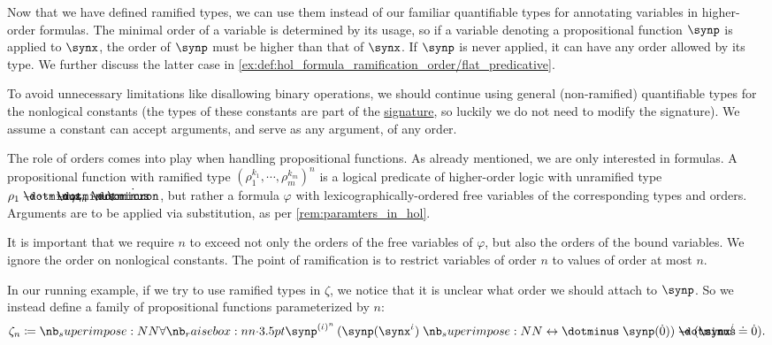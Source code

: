\begin{definition}
\begin{thmenum}
     Now that we have defined ramified types, we can use them instead of our familiar quantifiable types for annotating variables in higher-order formulas. The minimal order of a variable is determined by its usage, so if a variable denoting a propositional function \( \synp \) is applied to \( \synx \), the order of \( \synp \) must be higher than that of \( \synx \). If \( \synp \) is never applied, it can have any order allowed by its type. We further discuss the latter case in \cref{ex:def:hol_formula_ramification_order/flat_predicative}.

    To avoid unnecessary limitations like disallowing binary operations, we should continue using general (non-ramified) quantifiable types for the nonlogical constants (the types of these constants are part of the \hyperref[def:hol_signature]{signature}, so luckily we do not need to modify the signature). We assume a constant can accept arguments, and serve as any argument, of any order.

    The role of orders comes into play when handling propositional functions. As already mentioned, we are only interested in formulas. A propositional function with ramified type \( (\rho_1^{k_1}, \cdots, \rho_m^{k_m})^n \) is  a logical predicate of higher-order logic with unramified type \( \rho_1 \synimplies \cdots \synimplies \rho_m \synimplies \syn\omicron \), but rather a formula \( \varphi \) with lexicographically-ordered free variables of the corresponding types and orders. Arguments are to be applied via substitution, as per \cref{rem:paramters_in_hol}.

    It is important that we require \( n \) to exceed not only the orders of the free variables of \( \varphi \), but also the orders of the bound variables. We ignore the order on nonlogical constants. The point of ramification is to restrict variables of order \( n \) to values of order at most \( n \).

    In our running example, if we try to use ramified types in \( \zeta \), we notice that it is unclear what order we should attach to \( \synp \). So we instead define a family of propositional functions parameterized by \( n \):
    \begin{equation*}
      \zeta_n \coloneqq \qforall {\synp^{(\syn\iota)^n}} (\synp(\synx^{\syn\iota}) \syniff \synp(\syn0)) \synimplies (\synx^{\syn\iota} \syneq \syn0).
    \end{equation*}


\end{thmenum}
\end{definition}
